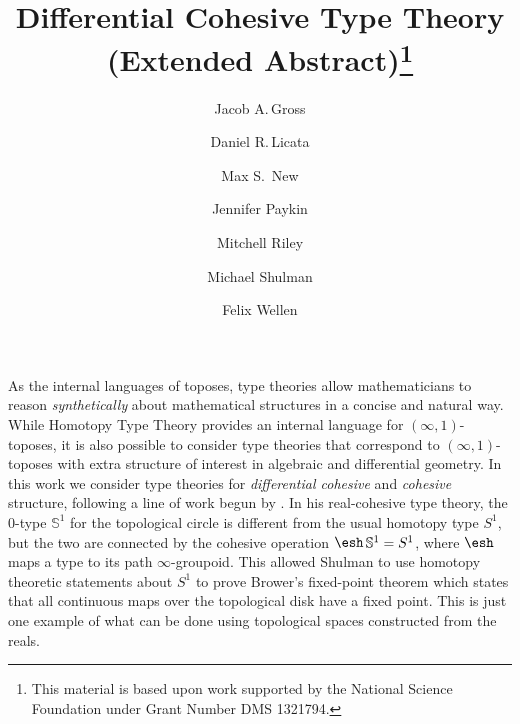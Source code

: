 \documentclass{article}
\title{Differential Cohesive Type Theory (Extended Abstract)\thanks{This
    material is based upon work supported by the National Science Foundation
    under Grant Number DMS 1321794.}}
\author{Jacob A.\,Gross}
\affil[1]{University of Pittsburgh}
\author[2]{Daniel R.\,Licata}
\affil[2]{Wesleyan University}
\author[3]{Max S.\, New}
\affil[3]{Northeastern University}
\author[4]{Jennifer Paykin}
\affil[4]{University of Pennsylvania}
\author[2]{Mitchell Riley}
\author[5]{Michael Shulman}
\affil[5]{University of San Diego}
\author[6]{Felix Wellen}
\affil[6]{Karlsruhe Institute of Technology}
\date{}
\begin{document}
\maketitle



As the internal languages of toposes, type theories allow mathematicians to
reason \emph{synthetically} about mathematical structures in a concise and
natural way. While Homotopy Type Theory provides an internal language for
$(\infty,1)$-toposes, it is also possible to consider type theories that
correspond to $(\infty,1)$-toposes with extra structure of interest in algebraic
and differential geometry. In this work we consider type theories for
\emph{differential cohesive} and \emph{cohesive} structure, following a line of
work begun by \citet{Shulman2015}.
In his real-cohesive type theory, the 0-type $\mathbb S^1$ for the topological
circle is different from the usual homotopy type $S^1$, but the two are
connected by the cohesive operation $\shape\,\mathbb S^1=S^1$, where $\shape$
maps a type to its path $\infty$-groupoid. 
This allowed Shulman to use homotopy theoretic statements about $S^1$ 
to prove Brower's fixed-point theorem which
states that all continuous maps over the topological disk have a fixed point.
This is just one example of what can be done using topological spaces constructed from the reals.

%
\end{document}
